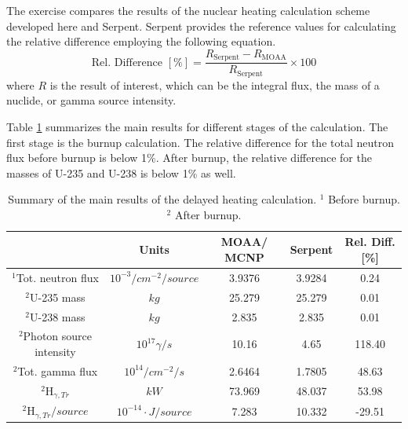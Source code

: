 The exercise compares the results of the nuclear heating calculation scheme developed here and Serpent.
Serpent provides the reference values for calculating the relative difference employing the following equation.
\begin{equation}
\textrm{Rel. Difference } [\%] = \frac{R_{\textrm{Serpent}} - R_{\textrm{MOAA}}}{R_{\textrm{Serpent}}} \times 100
\label{eq-rel-diff}
\end{equation}
where $R$ is the result of interest, which can be the integral flux, the mass of a nuclide, or gamma source intensity.

Table \ref{tab:gam-heat-results} summarizes the main results for different stages of the calculation.
The first stage is the burnup calculation.
The relative difference for the total neutron flux before burnup is below 1\%.
After burnup, the relative difference for the masses of U-235 and U-238 is below 1\% as well.

\begin{table}[htbp!]
  \centering
  \caption{Summary of the main results of the delayed heating calculation. $^1$ Before burnup. $^2$ After burnup.}
  \label{tab:gam-heat-results}
  \begin{tabular}{ccccc}
    \toprule
                                & Units                     & MOAA/ MCNP & Serpent & Rel. Diff. [\%] \\
    \midrule
    $^1$Tot. neutron flux       & $10^{-3}/cm^{-2}/source$  & 3.9376  & 3.9284  & 0.24    \\
    $^2$U-235 mass              & $kg$                      & 25.279  & 25.279  & 0.01    \\
    $^2$U-238 mass              & $kg$                      & 2.835   & 2.835   & 0.01    \\
    $^2$Photon source intensity & $10^{17}\gamma/s$         & 10.16   & 4.65    & 118.40  \\
    $^2$Tot. gamma flux         & $10^{14}/cm^{-2}/s$       & 2.6464  & 1.7805  & 48.63   \\
    $^2$H$_{\gamma, Tr}$        & $kW$                      & 73.969  & 48.037  & 53.98   \\
    $^2$H$_{\gamma, Tr}/source$ & $10^{-14} \cdot J/source$ & 7.283   & 10.332  & -29.51  \\
    \bottomrule
  \end{tabular}
\end{table}

